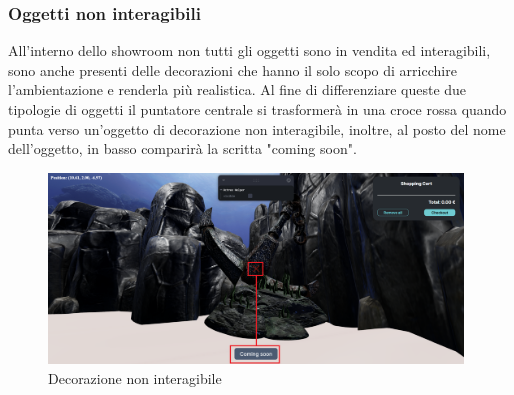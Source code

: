 \subsubsection{Oggetti non interagibili}
All'interno dello showroom non tutti gli oggetti sono in vendita ed interagibili, sono anche presenti delle decorazioni che hanno il solo scopo di arricchire l'ambientazione e renderla più realistica.
Al fine di differenziare queste due tipologie di oggetti il puntatore centrale si trasformerà in una croce rossa quando punta verso un'oggetto di decorazione non interagibile, inoltre, al posto del nome dell'oggetto, in basso comparirà la scritta "coming soon".
\begin{figure}[H]
  \renewcommand{\thefigure}{4}
\begin{center}
  \includegraphics[width=11cm]{./res/images/croce.png}
 \end{center}
 \caption{Decorazione non interagibile}
  \label{Decorazione non interagibile}
\end{figure}

\pagebreak

